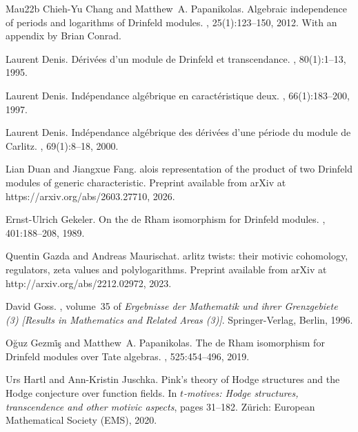 \documentclass[10pt,a4paper]{amsart}
\theoremstyle{plain} %
\theoremstyle{definition}
\theoremstyle{remark}
\numberwithin{equation}{subsection}
\begin{document}
\begin{thebibliography}{Mau22b}
Chieh-Yu Chang and Matthew~A. Papanikolas.
\newblock Algebraic independence of periods and logarithms of {D}rinfeld
  modules.
, 25(1):123--150, 2012.
\newblock With an appendix by Brian Conrad.

Laurent Denis.
\newblock D\'{e}riv\'{e}es d'un module de {D}rinfel\cprime d et transcendance.
, 80(1):1--13, 1995.

Laurent Denis.
\newblock Ind\'{e}pendance alg\'{e}brique en caract\'{e}ristique deux.
, 66(1):183--200, 1997.

Laurent Denis.
\newblock Ind\'{e}pendance alg\'{e}brique des d\'{e}riv\'{e}es d'une
  p\'{e}riode du module de {C}arlitz.
, 69(1):8--18, 2000.

Lian Duan and Jiangxue Fang.
alois representation of the product of two {D}rinfeld modules of
  generic characteristic.
\newblock Preprint available from arXiv at https://arxiv.org/abs/2603.27710,
  2026.

Ernst-Ulrich Gekeler.
\newblock On the de {R}ham isomorphism for {D}rinfel\cprime d modules.
, 401:188--208, 1989.

Quentin Gazda and Andreas Maurischat.
arlitz twists: their motivic cohomology, regulators, zeta values
  and polylogarithms.
\newblock Preprint available from arXiv at http://arxiv.org/abs/2212.02972,
  2023.

David Goss.
, volume~35 of
  {\em Ergebnisse der Mathematik und ihrer Grenzgebiete (3) [Results in
  Mathematics and Related Areas (3)]}.
\newblock Springer-Verlag, Berlin, 1996.

O\u{g}uz Gezm\.{i}\c{s} and Matthew~A. Papanikolas.
\newblock The de {R}ham isomorphism for {D}rinfeld modules over {T}ate
  algebras.
, 525:454--496, 2019.

Urs Hartl and Ann-Kristin Juschka.
\newblock Pink's theory of {Hodge} structures and the {Hodge} conjecture over
  function fields.
\newblock In {\em \(t\)-motives: Hodge structures, transcendence and other
  motivic aspects}, pages 31--182. Z{\"u}rich: European Mathematical Society
  (EMS), 2020.


\end{thebibliography}
\end{document}
